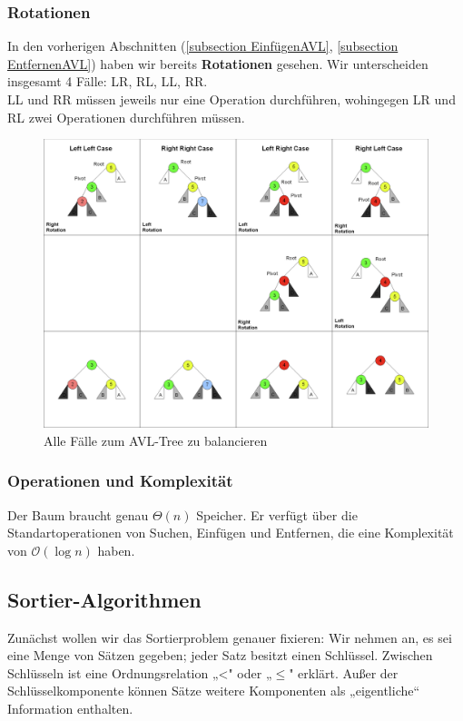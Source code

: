 \documentclass[a4paper]{article}
\begin{document}
\newpage


\subsubsection{Rotationen} \label{Rotationsabschnitt}
In den vorherigen Abschnitten (\ref{subsection EinfügenAVL}, \ref{subsection EntfernenAVL}) haben wir bereits \textbf{Rotationen} gesehen. Wir unterscheiden insgesamt 4 Fälle: LR, RL, LL, RR. \\
LL und RR müssen jeweils nur eine Operation durchführen, wohingegen LR und RL zwei Operationen durchführen müssen. 

\begin{figure}[h]
    \centering
    \includegraphics[scale = 0.4]{Pictures/AVL-Rotations.png}
    \caption{Alle Fälle zum AVL-Tree zu balancieren}
    \label{fig:AVL-rotations}
\end{figure}

\subsubsection{Operationen und Komplexität}
    Der Baum braucht genau $\Theta (n)$ Speicher. Er verfügt über die Standartoperationen von Suchen, Einfügen und Entfernen, die eine Komplexität von $\mathcal{O}(\log n)$ haben. 

    \newpage

\subsection{Sortier-Algorithmen}
Zunächst wollen wir das Sortierproblem genauer fixieren: Wir nehmen an, es sei eine
Menge von Sätzen gegeben; jeder Satz besitzt einen Schlüssel. Zwischen Schlüsseln ist
eine Ordnungsrelation „<" oder „$\leq$" erklärt. Außer der Schlüsselkomponente können
Sätze weitere Komponenten als „eigentliche“ Information enthalten.
\end{document}
